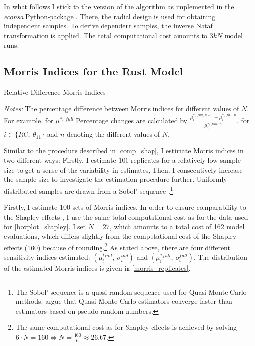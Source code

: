 In what follows I stick to the version of the algorithm as implemented in the \textit{econsa} Python-package \citep{OSE21}. There, the radial design is used for obtaining independent samples. To derive dependent samples, the inverse Nataf transformation is applied. The total computational cost amounts to $3kN$ model runs.

\subsection{Morris Indices for the Rust Model} \label{morris_rust_model}

\begin{table}[t]
    \caption{Relative Difference Morris Indices}
    \label{rel_diff_morris}
    \centering

    \begin{threeparttable}
        \begin{centering}
            
            \begin{tablenotes}
                \small
                \item \textit{Notes:} The percentage difference between Morris indices for different values of $N$. For example, for $\mu^{\ast,\ full}$ Percentage changes are calculated by $\frac{\mu^{\ast,\ full,\ n-1}_i - \mu^{\ast,\ full,\ n}_i}{\mu^{\ast,\ full,\ n}_i}$, for $i \in \{RC,\ \theta_{11}\}$ and $n$ denoting the different values of $N$.
            \end{tablenotes}
        \end{centering}

        \end{threeparttable}
\end{table}

Similar to the procedure described in \cref{comp_shap}, I estimate Morris indices in two different ways: Firstly, I estimate 100 replicates for a relatively low sample size to get a sense of the variability in estimates, Then, I consecutively increase the sample size to investigate
the estimation procedure further. Uniformly distributed samples are drawn from a Sobol'
sequence \citep{S76}.\footnote{The Sobol' sequence is a quasi-random sequence used for Quasi-Monte Carlo methods. \citet{KTA12} argue that Quasi-Monte Carlo estimators converge faster than estimators based on pseudo-random numbers.}

Firstly, I estimate 100 sets of Morris indices. In order to ensure comparability to the Shapley effects , I use the same total computational cost as for the data used for \cref{boxplot_shapley}. I set $N = 27$, which amounts
to a total cost of 162 model evaluations, which differs slightly from the computational
cost of the Shapley effects (160) because of rounding.\footnote{The same computational cost as for Shapley effects is achieved by solving $6 \cdot N = 160 \Leftrightarrow N = \frac{160}{6} \approx 26.67$.} As stated above, there are four different
sensitivity indices estimated: $(\mu^{\ast ind}_i,\ \sigma_i^{ind})$ and $(\mu^{\ast full}_i,\ \sigma_i^{full})$. The distribution of the
estimated Morris indices is given in \cref{morris_replicates}.

